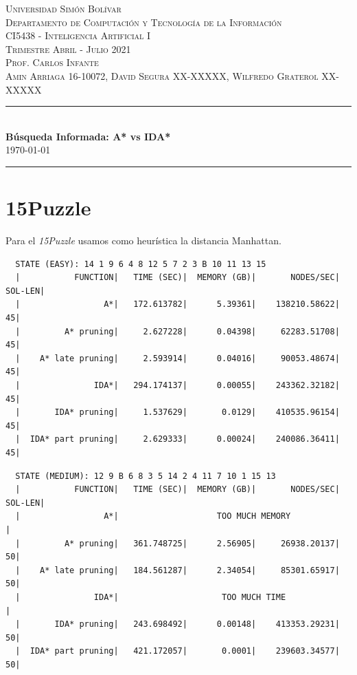 \documentclass[a4paper,10pt]{article}
\date{}
\newcommand{\HRule}{\rule{\linewidth}{0.5mm}}
\begin{document}
\begin{center}
  \textsc {
    Universidad Simón Bolívar \\[0cm]
    Departamento de Computaci\'on y Tecnolog\'ia de la Informaci\'on \\[0cm]
    CI5438 - Inteligencia Artificial I \\[0cm]
    Trimestre Abril - Julio 2021 \\[0cm]
    Prof. Carlos Infante \\[0cm]
    Amin Arriaga 16-10072, David Segura XX-XXXXX, Wilfredo Graterol XX-XXXXX
  }
  \HRule \\[0.4cm]
  {\Large \textbf{B\'usqueda Informada: A* vs IDA*}} \\[0.4cm]
  \textsc{
    \today
  }
  \HRule
\end{center}

\section{15Puzzle}
  Para el \textit{15Puzzle} usamos como heur\'istica la distancia Manhattan.

  
  \begin{verbatim}
  STATE (EASY): 14 1 9 6 4 8 12 5 7 2 3 B 10 11 13 15
  |           FUNCTION|   TIME (SEC)|  MEMORY (GB)|       NODES/SEC|    SOL-LEN|
  |                 A*|   172.613782|      5.39361|    138210.58622|         45|
  |         A* pruning|     2.627228|      0.04398|     62283.51708|         45|
  |    A* late pruning|     2.593914|      0.04016|     90053.48674|         45|
  |               IDA*|   294.174137|      0.00055|    243362.32182|         45|
  |       IDA* pruning|     1.537629|       0.0129|    410535.96154|         45|
  |  IDA* part pruning|     2.629333|      0.00024|    240086.36411|         45|
  \end{verbatim}        
  
  \begin{verbatim}  
  STATE (MEDIUM): 12 9 B 6 8 3 5 14 2 4 11 7 10 1 15 13                                                                                       
  |           FUNCTION|   TIME (SEC)|  MEMORY (GB)|       NODES/SEC|    SOL-LEN|
  |                 A*|                    TOO MUCH MEMORY                     |
  |         A* pruning|   361.748725|      2.56905|     26938.20137|         50|
  |    A* late pruning|   184.561287|      2.34054|     85301.65917|         50|
  |               IDA*|                     TOO MUCH TIME                      |
  |       IDA* pruning|   243.698492|      0.00148|    413353.29231|         50|
  |  IDA* part pruning|   421.172057|       0.0001|    239603.34577|         50|
  \end{verbatim}
\end{document}
